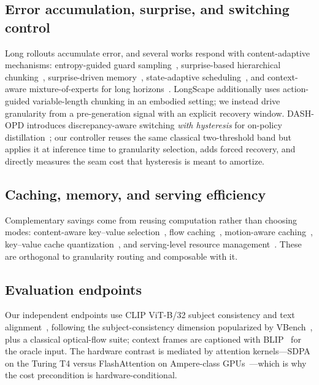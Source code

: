 \documentclass[journal]{IEEEtran}
\begin{document}
\subsection{Error accumulation, surprise, and switching control}
Long rollouts accumulate error, and several works respond with content-adaptive mechanisms: entropy-guided guard sampling~\cite{hanEntropyGuidedKGuard2026}, surprise-based hierarchical chunking~\cite{iiyamaSUNTAHierarchical2026}, surprise-driven memory~\cite{shiSurpriseForcingWhat2026}, state-adaptive scheduling~\cite{sunSANTSStateAdaptiveScheduler2026}, and context-aware mixture-of-experts for long horizons~\cite{shangLongScapeAdvancingLongHorizon2025}. LongScape additionally uses action-guided variable-length chunking in an embodied setting; we instead drive granularity from a pre-generation signal with an explicit recovery window. DASH-OPD introduces discrepancy-aware switching \emph{with hysteresis} for on-policy distillation~\cite{xiaDASHOPDDiscrepancy2026}; our controller reuses the same classical two-threshold band but applies it at inference time to granularity selection, adds forced recovery, and directly measures the seam cost that hysteresis is meant to amortize.

\subsection{Caching, memory, and serving efficiency}
Complementary savings come from reusing computation rather than choosing modes: content-aware key--value selection~\cite{caiFocusedForcingContentAware2026}, flow caching~\cite{maFlowCachingAutoregressive2026}, motion-aware caching~\cite{xuMotionAwareCachingEfficient2026}, key--value cache quantization~\cite{ranganathKVCacheQuantization2026}, and serving-level resource management~\cite{xiaAdaptiveResourceManagement2026}. These are orthogonal to granularity routing and composable with it.

\subsection{Evaluation endpoints}
Our independent endpoints use CLIP ViT-B/32 subject consistency and text alignment~\cite{radford2021clip}, following the subject-consistency dimension popularized by VBench~\cite{huang2024vbench}, plus a classical optical-flow suite; context frames are captioned with BLIP~\cite{li2022blip} for the oracle input. The hardware contrast is mediated by attention kernels---SDPA on the Turing T4 versus FlashAttention on Ampere-class GPUs~\cite{dao2022flashattention}---which is why the cost precondition is hardware-conditional.
\end{document}

